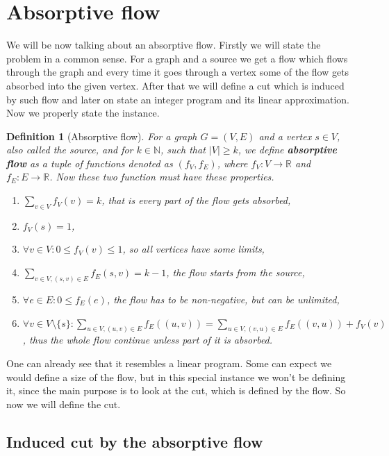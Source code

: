 \documentclass{article}
\theoremstyle{plain}
\theoremstyle{plain}
\newtheorem{defn}{Definition}
\theoremstyle{remark}
\begin{document}
	\section{Absorptive flow}
	
	We will be now talking about an absorptive flow. Firstly we will state the problem in a common sense. For a graph and a source we get a flow which flows through the graph and every time it goes through a vertex some of the flow gets absorbed into the given vertex. After that we will define a cut which is induced by such flow and later on state an integer program and its linear approximation. Now we properly state the instance.
	
	\begin{defn}[Absorptive flow]
		For a graph $G = (V,E)$ and a vertex $s \in V$, also called the \textit{source}, and for $k \in \mathbb{N}$, such that $|V| \geq k$, we define \textbf{absorptive flow} as a tuple of functions denoted as $(f_V, f_E)$, where $f_V : V \to \mathbb{R}$ and $f_E : E \to \mathbb{R}$. Now these two function must have these properties.
		
		\begin{enumerate}
			\item $\sum_{v \in V} f_V (v) = k$, that is every part of the flow gets absorbed,
			\item $f_V(s) = 1$,
			\item $\forall v \in V : 0 \leq f_V(v) \leq 1$, so all vertices have some limits,
			\item $\sum_{v \in V, (s,v) \in E} f_E(s,v) = k-1$, the flow starts from the source,
			\item $\forall e \in E : 0 \leq f_E(e)$, the flow has to be non-negative, but can be unlimited,
			\item $\forall v \in V \setminus \{s\}: \sum_{u \in V, (u,v) \in E} f_E((u,v)) = \sum_{u \in V, (v,u) \in E} f_E((v,u)) + f_V(v)$, thus the whole flow continue unless part of it is absorbed.
		\end{enumerate}
	\end{defn}
	
	One can already see that it resembles a linear program. Some can expect we would define a size of the flow, but in this special instance we won't be defining it, since the main purpose is to look at the cut, which is defined by the flow. So now we will define the cut.
	
	\subsection{Induced cut by the absorptive flow}
	
\end{document}
